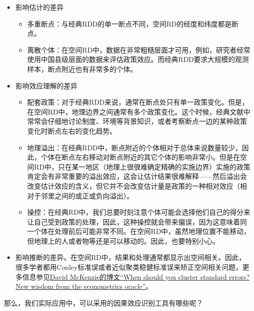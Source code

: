 \documentclass[cn,12pt,math=newtx,citestyle=gb7714-2015,bibstyle=gb7714-2015]{elegantbook}
\begin{document}
	\begin{itemize}
		\item 影响估计的差异
		\begin{itemize}
			\item 多重断点：与经典RDD的单一断点不同，空间RD的经度和纬度都是断点。
			\item 离散个体：在空间RD中，数据在非常粗糙层面才可用，例如，研究者经常使用中国县级层面的数据来评估政策效应。而经典RDD要求大规模的观测样本，断点附近也有非常多的个体。
		\end{itemize}
	    \item 影响效应理解的差异
	    \begin{itemize}
	    	\item 配套政策：对于经典RDD来说，通常在断点处只有单一政策变化。但是，在空间RD中，地理边界之间通常有多个政策变化。这个时候，经典文献中常常会仔细地讨论制度、环境等背景知识，或者考察断点一边的某种政策变化时断点左右的变化趋势。
	    	\item 地理溢出：在经典RDD中，断点附近的个体相对于总体来说数量较少，因此，个体在断点左右移动对断点附近的其它个体的影响非常小。但是在空间RD中，只在某一地区（地理上很很难确定精确的实施边界）实施的政策肯定会有非常重要的溢出效应，这会让估计结果很难解释——然后溢出会改变估计效应的含义，但它并不会改变估计量是政策的一种相对效应（相对于邻里之间的或正或负向溢出）。
	    	\item 操控：在经典RD中，我们总要时刻注意个体可能会选择他们自己的得分来让自己受到政策的处理，因此，这种操控就会带来偏误，因为这意味着同一个体在处理前后可能非常不同。在空间RD中，虽然地理位置不能移动，但地理上的人或者物等还是可以移动的。因此，也要特别小心。
	    \end{itemize}
        \item 影响推断的差异。在空间RD中，结果和处理通常都显示出空间相关。因此，很多学者都用Conley标准误或者近似聚类稳健标准误来矫正空间相关问题，更多信息参见\href{https://blogs.worldbank.org/impactevaluations/when-should-you-cluster-standard-errors-new-wisdom-econometrics-oracle}{David McKenzie的博文“When should you cluster standard errors? New wisdom from the econometrics oracle”}。
	\end{itemize}
	
	那么，我们实际应用中，可以采用的因果效应识别工具有哪些呢？
	
\end{document}
